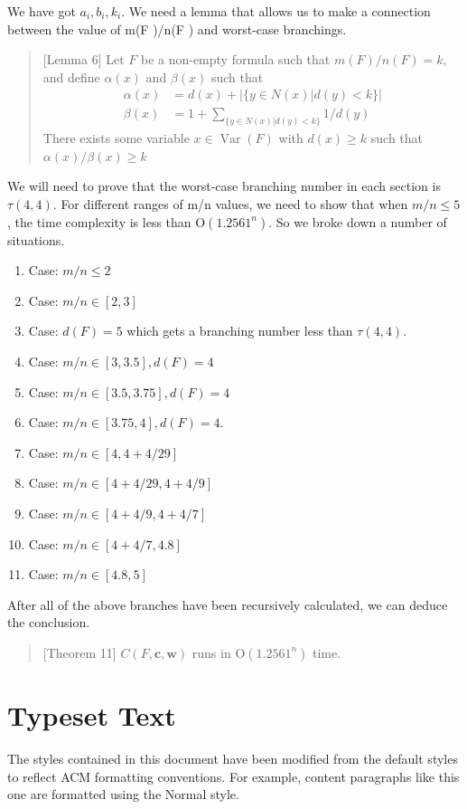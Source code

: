 \documentclass{sigchi}
\begin{document}
 We have got $a_{i},b_{i},k_{i}$. We need a lemma that allows us to make a connection between the value of m(F )/n(F ) and worst-case branchings.
\begin{quote}[Lemma 6]
	Let $F$ be a non-empty formula such that $m(F) / n(F)=k,$ and define $\alpha(x)$ and
	$\beta(x)$ such that
	$$
	\begin{aligned}
	\alpha(x) &=d(x)+|\{y \in N(x) | d(y)<k\}| \\
	\beta(x) &=1+\sum_{\{y \in N(x) | d(y)<k\}} 1 / d(y)
	\end{aligned}
	$$
	There exists some variable $x \in \operatorname{Var}(F)$ with $d(x) \geqslant k$ such that $\alpha(x) / \beta(x) \geqslant k$
\end{quote}
We will need to prove that the worst-case branching number in each section is $\tau(4,4)$. For different ranges of m/n values, we need to show that when $m/n\leqslant5$, the time complexity is less than $\mathrm{O}\left(1.2561^{n}\right)$. So we broke down a number of situations.
\begin{enumerate}
	\item Case: $m / n \leqslant2$
		\item Case: $m / n \in[2,3]$
	\item Case: $d(F)=5$ which gets a branching number less than $\tau(4,4)$.
	\item Case: $m / n \in[3,3.5], d(F)=4$
	\item Case: $m / n \in[3.5,3.75], d(F)=4$
	\item Case: $ m / n \in[3.75,4], d(F)=4 .$ 
	\item Case:  $m / n \in[4,4+4 / 29]$
	\item Case: $m / n \in[4+4 / 29,4+4 / 9]$
	\item Case: $m / n \in[4+4 / 9,4+4 / 7]$
	\item Case: $m / n \in[4+4 / 7,4.8]$
	\item Case: $m / n \in[4.8,5]$
\end{enumerate}
After all of the above branches have been recursively calculated, we can deduce the conclusion.
\begin{quote}[Theorem 11]
	$C(F, \mathbf{c}, \mathbf{w})$ runs in $\mathrm{O}\left(1.2561^{n}\right)$ time.
\end{quote}
\section{Typeset Text}
The styles contained in this document have been modified from the
default styles to reflect ACM formatting conventions. For example,
content paragraphs like this one are formatted using the Normal style.
\end{document}
